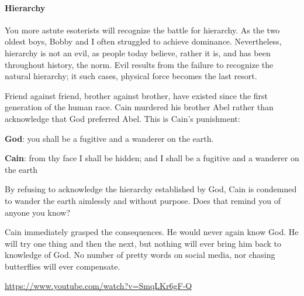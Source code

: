 \paragraph{Hierarchy}


You more astute esoterists will recognize the battle for hierarchy. As the two oldest boys, Bobby and I often struggled to achieve dominance. Nevertheless, hierarchy is not an evil, as people today believe, rather it is, and has been throughout history, the norm. Evil results from the failure to recognize the natural hierarchy; it such cases, physical force becomes the last resort.

Friend against friend, brother against brother, have existed since the first generation of the human race. Cain murdered his brother Abel rather than acknowledge that God preferred Abel. This is Cain's punishment:

\textbf{God}: you shall be a fugitive and a wanderer on the earth.


\textbf{Cain}: from thy face I shall be hidden; and I shall be a fugitive and a wanderer on the earth

By refusing to acknowledge the hierarchy established by God, Cain is condemned to wander the earth aimlessly and without purpose. Does that remind you of anyone you know?

Cain immediately grasped the consequences. He would never again know God. He will try one thing and then the next, but nothing will ever bring him back to knowledge of God. No number of pretty words on social media, nor chasing butterflies will ever compensate.

\url{https://www.youtube.com/watch?v=SmqLKr6gF-Q}


